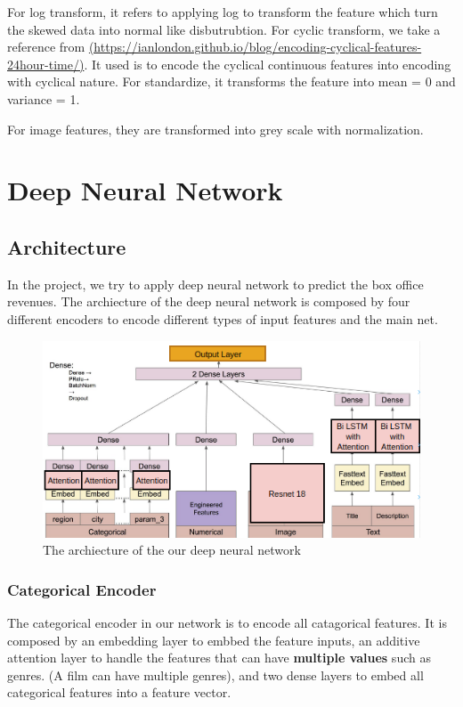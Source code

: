 \documentclass{article}
\begin{document}
For log transform, it refers to applying log to transform the feature which turn the skewed data into normal like disbutrubtion. For cyclic transform, we take a reference from \url{(https://ianlondon.github.io/blog/encoding-cyclical-features-24hour-time/)}. It used is to encode the cyclical continuous features into encoding with cyclical nature. For standardize, it transforms the feature into mean = 0 and variance = 1.

For image features, they are transformed into grey scale with normalization.

\pagebreak



\section{Deep Neural Network}

\subsection{Architecture}
In the project, we try to apply deep neural network to predict the box office revenues. The archiecture of the deep neural network is composed by four different encoders to encode different types of input features and the main net. 

\begin{figure}[h]
  \centering
  \includegraphics[scale=1]{map.png}
  \caption{The archiecture of the our deep neural network}
\end{figure}

\subsubsection{Categorical Encoder}

The categorical encoder in our network is to encode all catagorical features. It is composed by an embedding layer to embbed the feature inputs, an additive attention layer to handle the features that can have \textbf{multiple values} such as genres. (A film can have multiple genres), and two dense layers to embed all categorical features into a feature vector.
\end{document}
